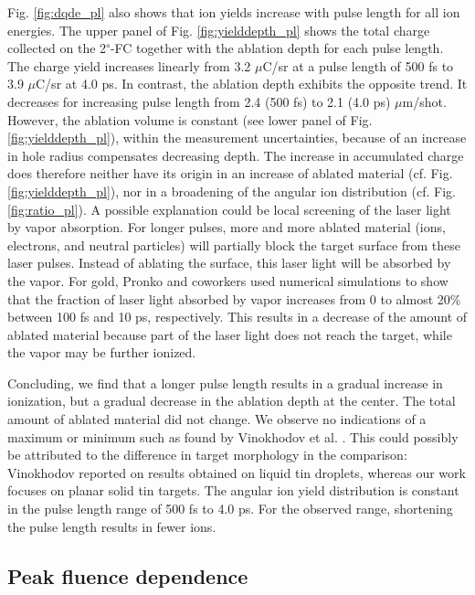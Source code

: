\documentclass[aip, jap, reprint, amsmath, amssymb]{revtex4-1}
\begin{document}
Fig. \ref{fig:dqde_pl} also shows that ion yields increase with pulse length for all ion energies. The upper panel of Fig. \ref{fig:yielddepth_pl} shows the total charge collected on the 2\textsuperscript{$\circ$}-FC together with the ablation depth for each pulse length. The charge yield increases linearly from 3.2 $\mu$C/sr at a pulse length of 500 fs to 3.9 $\mu$C/sr at 4.0 ps. In contrast, the ablation depth exhibits the opposite trend. It decreases for increasing pulse length from 2.4 (500 fs) to 2.1 (4.0 ps) $\mu$m/shot. However, the ablation volume is constant (see lower panel of Fig. \ref{fig:yielddepth_pl}), within the measurement uncertainties, because of an increase in hole radius compensates decreasing depth. The increase in accumulated charge does therefore neither have its origin in an increase of ablated material (cf. Fig. \ref{fig:yielddepth_pl}), nor in a broadening of the angular ion distribution (cf. Fig. \ref{fig:ratio_pl}). A possible explanation could be local screening of the laser light by vapor absorption\cite{harzic2005,nolte1997}. For longer pulses, more and more ablated material (ions, electrons, and neutral particles) will partially block the target surface from these laser pulses. Instead of ablating the surface, this laser light will be absorbed by the vapor. For gold, Pronko and coworkers \cite{pronko1995} used numerical simulations to show that the fraction of laser light absorbed by vapor increases from 0 to almost 20\% between 100 fs and 10 ps, respectively. This results in a decrease of the amount of ablated material because part of the laser light does not reach the target, while the vapor may be further ionized.

Concluding, we find that a longer pulse length results in a gradual increase in ionization, but a gradual decrease in the ablation depth at the center. The total amount of ablated material did not change. We observe no indications of a maximum or minimum such as found by Vinokhodov et al. \cite{vinokhodov2016,vinokhodov2016b}. This could possibly be attributed to the difference in target morphology in the comparison: Vinokhodov reported on results obtained on liquid tin droplets, whereas our work focuses on planar solid tin targets. The angular ion yield distribution is constant in the pulse length range of 500 fs to 4.0 ps. For the observed range, shortening the pulse length results in fewer ions.


\subsection*{Peak fluence dependence}
\end{document}
